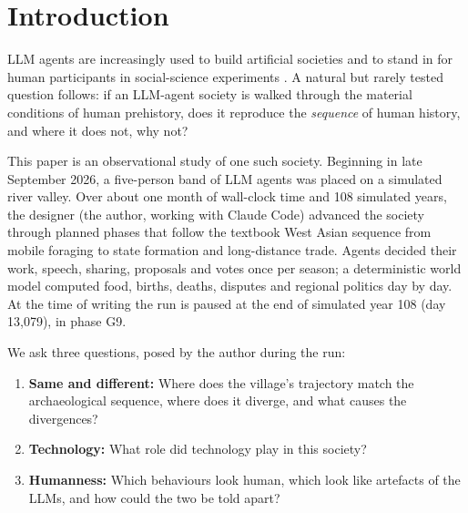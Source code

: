 \documentclass[11pt]{article}
\begin{document}
\section{Introduction}

LLM agents are increasingly used to build artificial societies \citep{park2023generative,altera2024sid,piatti2024cooperate} and to stand in for human participants in social-science experiments \citep{horton2023homo,aher2023using,argyle2023out}. A natural but rarely tested question follows: if an LLM-agent society is walked through the material conditions of human prehistory, does it reproduce the \emph{sequence} of human history, and where it does not, why not?

This paper is an observational study of one such society. Beginning in late September 2026, a five-person band of LLM agents was placed on a simulated river valley. Over about one month of wall-clock time and 108 simulated years, the designer (the author, working with Claude Code) advanced the society through planned phases that follow the textbook West Asian sequence from mobile foraging to state formation and long-distance trade. Agents decided their work, speech, sharing, proposals and votes once per season; a deterministic world model computed food, births, deaths, disputes and regional politics day by day. At the time of writing the run is paused at the end of simulated year 108 (day 13{,}079), in phase G9.

We ask three questions, posed by the author during the run:
\begin{enumerate}
  \item \textbf{Same and different:} Where does the village's trajectory match the archaeological sequence, where does it diverge, and what causes the divergences?
  \item \textbf{Technology:} What role did technology play in this society?
  \item \textbf{Humanness:} Which behaviours look human, which look like artefacts of the LLMs, and how could the two be told apart?
\end{enumerate}
\end{document}
